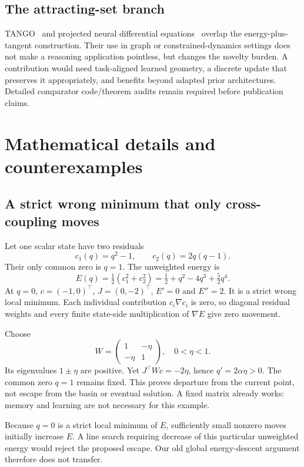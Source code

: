 \documentclass[11pt,a4paper]{article}
\newcommand{\newtopic}{\clearpage}
\begin{document}
\subsection{The attracting-set branch}
TANGO~\cite{tango} and projected neural differential equations~\cite{pnde} overlap the energy-plus-tangent construction. Their use in graph or constrained-dynamics settings does not make a reasoning application pointless, but changes the novelty burden. A contribution would need task-aligned learned geometry, a discrete update that preserves it appropriately, and benefits beyond adapted prior architectures. Detailed comparator code/theorem audits remain required before publication claims.


\appendix
\newtopic
\section{Mathematical details and counterexamples}\label{app:proofs}
\subsection{A strict wrong minimum that only cross-coupling moves}
Let one scalar state have two residuals
\[
c_1(q)=q^2-1,\qquad c_2(q)=2q(q-1).
\]
Their only common zero is $q=1$. The unweighted energy is
\[
E(q)=\tfrac12(c_1^2+c_2^2)=\tfrac12+q^2-4q^3+\tfrac52q^4.
\]
At $q=0$, $c=(-1,0)^\top$, $J=(0,-2)^\top$, $E'=0$ and $E''=2$. It is a strict wrong local minimum. Each individual contribution $c_i\nabla c_i$ is zero, so diagonal residual weights and every finite state-side multiplication of $\nabla E$ give zero movement.

Choose
\[
W=\begin{pmatrix}1&-\eta\\-\eta&1\end{pmatrix},\quad 0<\eta<1.
\]
Its eigenvalues $1\pm\eta$ are positive. Yet $J^\top Wc=-2\eta$, hence $q'=2\alpha\eta>0$. The common zero $q=1$ remains fixed. This proves departure from the current point, not escape from the basin or eventual solution. A fixed matrix already works: memory and learning are not necessary for this example.

Because $q=0$ is a strict local minimum of $E$, sufficiently small nonzero moves initially increase $E$. A line search requiring decrease of this particular unweighted energy would reject the proposed escape. Our old global energy-descent argument therefore does not transfer.
\end{document}
